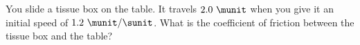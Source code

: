 You slide a tissue box on the table. It travels $2.0\ \munit$ when
you give it an initial speed of $1.2\ \munit / \sunit$. What is the
coefficient of friction between the tissue box and the table?
